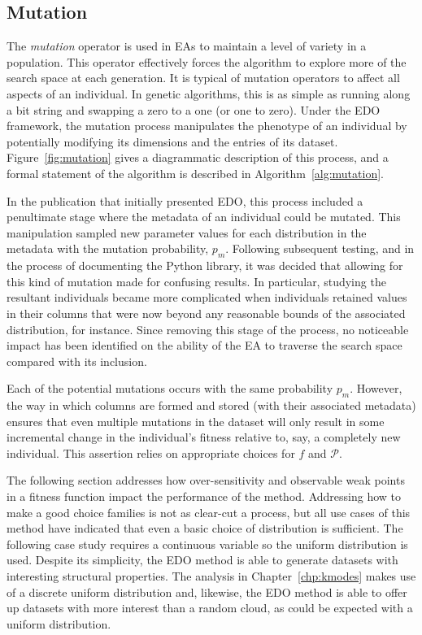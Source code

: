 \subsection{Mutation}\label{subsection:mutation}

The \emph{mutation} operator is used in EAs to maintain a level of variety in a
population. This operator effectively forces the algorithm to explore more of
the search space at each generation. It is typical of mutation operators to
affect all aspects of an individual. In genetic algorithms, this is as simple as
running along a bit string and swapping a zero to a one (or one to zero). Under
the EDO framework, the mutation process manipulates the phenotype of an
individual by potentially modifying its dimensions and the entries of its
dataset. Figure~\ref{fig:mutation} gives a diagrammatic description of this
process, and a formal statement of the algorithm is described in
Algorithm~\ref{alg:mutation}.

In the publication that initially presented EDO, this process included a
penultimate stage where the metadata of an individual could be mutated. This
manipulation sampled new parameter values for each distribution in the metadata
with the mutation probability, \(p_m\). Following subsequent testing, and in the
process of documenting the Python library, it was decided that allowing for this
kind of mutation made for confusing results. In particular, studying the
resultant individuals became more complicated when individuals retained values
in their columns that were now beyond any reasonable bounds of the associated
distribution, for instance. Since removing this stage of the process, no
noticeable impact has been identified on the ability of the EA to traverse the
search space compared with its inclusion.


Each of the potential mutations occurs with the same probability \(p_m\).
However, the way in which columns are formed and stored (with their associated
metadata) ensures that even multiple mutations in the dataset will only result
in some incremental change in the individual's fitness relative to, say, a
completely new individual. This assertion relies on appropriate choices for
\(f\) and \(\mathcal{P}\).

The following section addresses how over-sensitivity and observable weak points
in a fitness function impact the performance of the method. Addressing how to
make a good choice families is not as clear-cut a process, but all use cases of
this method have indicated that even a basic choice of distribution is
sufficient. The following case study requires a continuous variable so the
uniform distribution is used. Despite its simplicity, the EDO method is able to
generate datasets with interesting structural properties. The analysis in
Chapter~\ref{chp:kmodes} makes use of a discrete uniform distribution and,
likewise, the EDO method is able to offer up datasets with more interest than a
random cloud, as could be expected with a uniform distribution.


